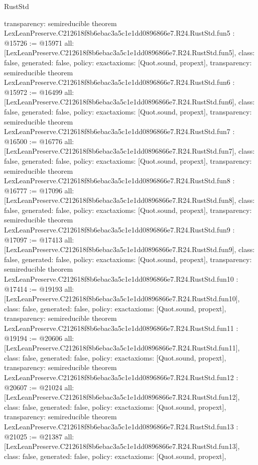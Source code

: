 \begin{lexlean}{RustStd}
\begin{coremodule}
{  transparency: semireducible
}
theorem LexLeanPreserve.C212618f8b6ebac3a5c1e1dd0896866e7.R24.RustStd.fun5 : @15726 := @15971 {
  all: [LexLeanPreserve.C212618f8b6ebac3a5c1e1dd0896866e7.R24.RustStd.fun5],
  class: false,
  generated: false,
  policy: exact{axioms: [Quot.sound, propext]},
  transparency: semireducible
}
theorem LexLeanPreserve.C212618f8b6ebac3a5c1e1dd0896866e7.R24.RustStd.fun6 : @15972 := @16499 {
  all: [LexLeanPreserve.C212618f8b6ebac3a5c1e1dd0896866e7.R24.RustStd.fun6],
  class: false,
  generated: false,
  policy: exact{axioms: [Quot.sound, propext]},
  transparency: semireducible
}
theorem LexLeanPreserve.C212618f8b6ebac3a5c1e1dd0896866e7.R24.RustStd.fun7 : @16500 := @16776 {
  all: [LexLeanPreserve.C212618f8b6ebac3a5c1e1dd0896866e7.R24.RustStd.fun7],
  class: false,
  generated: false,
  policy: exact{axioms: [Quot.sound, propext]},
  transparency: semireducible
}
theorem LexLeanPreserve.C212618f8b6ebac3a5c1e1dd0896866e7.R24.RustStd.fun8 : @16777 := @17096 {
  all: [LexLeanPreserve.C212618f8b6ebac3a5c1e1dd0896866e7.R24.RustStd.fun8],
  class: false,
  generated: false,
  policy: exact{axioms: [Quot.sound, propext]},
  transparency: semireducible
}
theorem LexLeanPreserve.C212618f8b6ebac3a5c1e1dd0896866e7.R24.RustStd.fun9 : @17097 := @17413 {
  all: [LexLeanPreserve.C212618f8b6ebac3a5c1e1dd0896866e7.R24.RustStd.fun9],
  class: false,
  generated: false,
  policy: exact{axioms: [Quot.sound, propext]},
  transparency: semireducible
}
theorem LexLeanPreserve.C212618f8b6ebac3a5c1e1dd0896866e7.R24.RustStd.fun10 : @17414 := @19193 {
  all: [LexLeanPreserve.C212618f8b6ebac3a5c1e1dd0896866e7.R24.RustStd.fun10],
  class: false,
  generated: false,
  policy: exact{axioms: [Quot.sound, propext]},
  transparency: semireducible
}
theorem LexLeanPreserve.C212618f8b6ebac3a5c1e1dd0896866e7.R24.RustStd.fun11 : @19194 := @20606 {
  all: [LexLeanPreserve.C212618f8b6ebac3a5c1e1dd0896866e7.R24.RustStd.fun11],
  class: false,
  generated: false,
  policy: exact{axioms: [Quot.sound, propext]},
  transparency: semireducible
}
theorem LexLeanPreserve.C212618f8b6ebac3a5c1e1dd0896866e7.R24.RustStd.fun12 : @20607 := @21024 {
  all: [LexLeanPreserve.C212618f8b6ebac3a5c1e1dd0896866e7.R24.RustStd.fun12],
  class: false,
  generated: false,
  policy: exact{axioms: [Quot.sound, propext]},
  transparency: semireducible
}
theorem LexLeanPreserve.C212618f8b6ebac3a5c1e1dd0896866e7.R24.RustStd.fun13 : @21025 := @21387 {
  all: [LexLeanPreserve.C212618f8b6ebac3a5c1e1dd0896866e7.R24.RustStd.fun13],
  class: false,
  generated: false,
  policy: exact{axioms: [Quot.sound, propext]},
}
\end{coremodule}
\end{lexlean}
